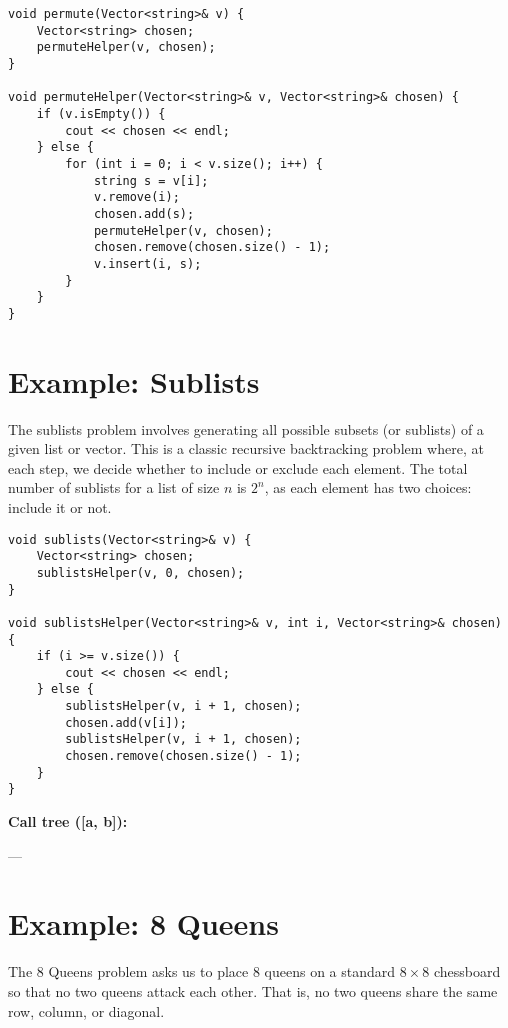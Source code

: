 \documentclass{article}
\begin{document}
\begin{lstlisting}[style=cppstyle]
void permute(Vector<string>& v) {
    Vector<string> chosen;
    permuteHelper(v, chosen);
}

void permuteHelper(Vector<string>& v, Vector<string>& chosen) {
    if (v.isEmpty()) {
        cout << chosen << endl;
    } else {
        for (int i = 0; i < v.size(); i++) {
            string s = v[i];
            v.remove(i);
            chosen.add(s);
            permuteHelper(v, chosen);
            chosen.remove(chosen.size() - 1);
            v.insert(i, s);
        }
    }
}
\end{lstlisting}




\section{Example: Sublists}
The sublists problem involves generating all possible subsets (or sublists) of a given list or vector. This is a classic recursive backtracking problem where, at each step, we decide whether to include or exclude each element. The total number of sublists for a list of size $n$ is $2^n$, as each element has two choices: include it or not.


\begin{lstlisting}[style=cppstyle]
void sublists(Vector<string>& v) {
    Vector<string> chosen;
    sublistsHelper(v, 0, chosen);
}

void sublistsHelper(Vector<string>& v, int i, Vector<string>& chosen) {
    if (i >= v.size()) {
        cout << chosen << endl;
    } else {
        sublistsHelper(v, i + 1, chosen);
        chosen.add(v[i]);
        sublistsHelper(v, i + 1, chosen);
        chosen.remove(chosen.size() - 1);
    }
}
\end{lstlisting}

\textbf{Call tree ([a, b]):}

\begin{center}
\end{center}

---

\section{Example: 8 Queens}
The 8 Queens problem asks us to place 8 queens on a standard $8 \times 8$ chessboard so that no two queens attack each other. That is, no two queens share the same row, column, or diagonal. 
\end{document}

